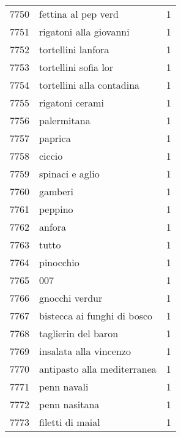 \begin{tabular}{llr}
7750 &                                fettina al pep verd &      1 \\
7751 &                             rigatoni alla giovanni &      1 \\
7752 &                                 tortellini lanfora &      1 \\
7753 &                               tortellini sofia lor &      1 \\
7754 &                          tortellini alla contadina &      1 \\
7755 &                                    rigatoni cerami &      1 \\
7756 &                                        palermitana &      1 \\
7757 &                                            paprica &      1 \\
7758 &                                             ciccio &      1 \\
7759 &                                    spinaci e aglio &      1 \\
7760 &                                            gamberi &      1 \\
7761 &                                            peppino &      1 \\
7762 &                                             anfora &      1 \\
7763 &                                              tutto &      1 \\
7764 &                                          pinocchio &      1 \\
7765 &                                                007 &      1 \\
7766 &                                     gnocchi verdur &      1 \\
7767 &                        bistecca ai funghi di bosco &      1 \\
7768 &                                taglierin del baron &      1 \\
7769 &                             insalata alla vincenzo &      1 \\
7770 &                        antipasto alla mediterranea &      1 \\
7771 &                                        penn navali &      1 \\
7772 &                                      penn nasitana &      1 \\
7773 &                                   filetti di maial &      1 \\

\end{tabular}
